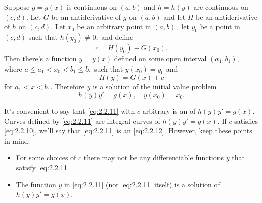 \documentclass{ximera}
\begin{document}
\begin{theorem}\label{thmtype:2.2.1}
Suppose $g=g(x)$ is continuous on $(a,b)$ and $h=h(y)$
are continuous on $(c,d)$. Let $G$ be an antiderivative of
$g$ on $(a,b)$ and let $H$ be an antiderivative of $h$ on $(c,d).$
Let $x_0$ be an arbitrary point in $(a,b),$ let $y_0$
be a point in $(c,d)$ such that $h(y_0)\neq 0,$ and define
\begin{equation} \label{eq:2.2.10}
c=H(y_0)-G(x_0).
\end{equation}
Then there's a function $y=y(x)$ defined on some open interval
$(a_1,b_1),$ where $a\leq a_1<x_0<b_1\leq b,$ such that  $y(x_0)=y_0$
and
\begin{equation} \label{eq:2.2.11}
H(y)=G(x)+c
\end{equation}
for $a_1<x<b_1$.
Therefore $y$ is a solution of the initial value problem
\begin{equation} \label{eq:2.2.12}
h(y)y'=g(x),\quad y(x_0)=x_0.
\end{equation}
\end{theorem}


It's convenient to say that \eqref{eq:2.2.11} with $c$ arbitrary is an
 of $h(y)y'=g(x)$. Curves defined by
\eqref{eq:2.2.11} are integral curves of $h(y)y'=g(x)$. If $c$ satisfies
\eqref{eq:2.2.10}, we'll say that \eqref{eq:2.2.11} is an  \eqref{eq:2.2.12}. However, keep
these  points in mind:
\begin{itemize}
\item  For some choices of $c$ there may not be any differentiable
functions $y$ that satisfy \eqref{eq:2.2.11}.
\item  The function $y$ in \eqref{eq:2.2.11} (not \eqref{eq:2.2.11} itself)
is a solution of $h(y)y'=g(x)$.
\end{itemize}
\end{document}
